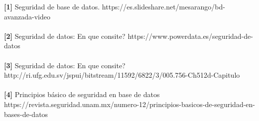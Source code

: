 \begin{thebibliography}
\textbf{[1]} Seguridad de base de datos. https://es.slideshare.net/mesarango/bd-avanzada-video\\\\

\textbf{[2]} Seguridad de datos: En que consite? https://www.powerdata.es/seguridad-de-datos\\\\

\textbf{[3]} Seguridad de datos: En que consite? http://ri.ufg.edu.sv/jspui/bitstream/11592/6822/3/005.756-Ch512d-Capitulo\\\\


\textbf{[4]} Principios básico de seguridad en base de datos https://revista.seguridad.unam.mx/numero-12/principios-basicos-de-seguridad-en-bases-de-datos\\\\


\end{thebibliography}
